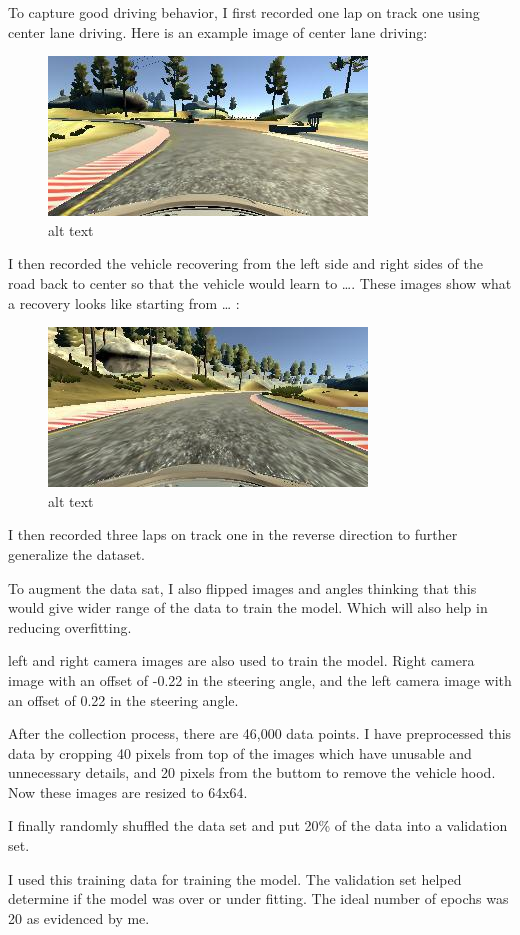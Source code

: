 \documentclass[11pt]{article}
\makeatletter
\def\maxwidth{\ifdim\Gin@nat@width>\linewidth\linewidth
    \else\Gin@nat@width\fi}
\let\Oldincludegraphics\includegraphics
\renewcommand{\includegraphics}[1]{\Oldincludegraphics[width=.8\maxwidth]{#1}}
\makeatother
\begin{document}
To capture good driving behavior, I first recorded one lap on track one
using center lane driving. Here is an example image of center lane
driving:

\begin{figure}
\centering
\includegraphics{./examples/forward.jpg}
\caption{alt text}
\end{figure}

I then recorded the vehicle recovering from the left side and right
sides of the road back to center so that the vehicle would learn to
\ldots{}. These images show what a recovery looks like starting from
\ldots{} :

\begin{figure}
\centering
\includegraphics{./examples/reverse.jpg}
\caption{alt text}
\end{figure}

I then recorded three laps on track one in the reverse direction to
further generalize the dataset.

To augment the data sat, I also flipped images and angles thinking that
this would give wider range of the data to train the model. Which will
also help in reducing overfitting.

left and right camera images are also used to train the model. Right
camera image with an offset of -0.22 in the steering angle, and the left
camera image with an offset of 0.22 in the steering angle.

After the collection process, there are 46,000 data points. I have
preprocessed this data by cropping 40 pixels from top of the images
which have unusable and unnecessary details, and 20 pixels from the
buttom to remove the vehicle hood. Now these images are resized to
64x64.

I finally randomly shuffled the data set and put 20\% of the data into a
validation set.

I used this training data for training the model. The validation set
helped determine if the model was over or under fitting. The ideal
number of epochs was 20 as evidenced by me.


    
    
    
    
\end{document}
